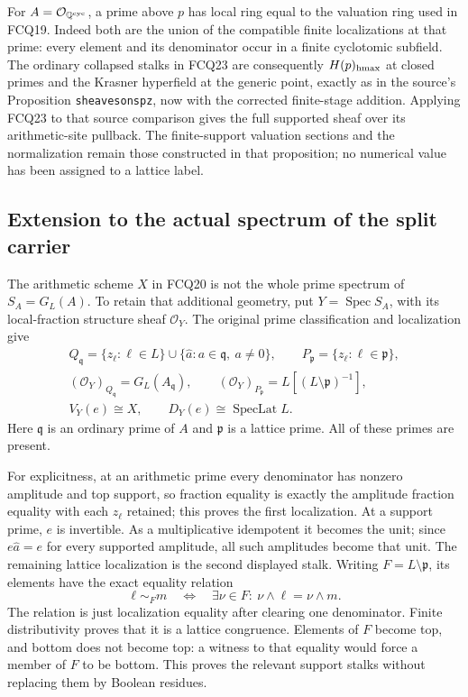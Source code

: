 For $A=\mathcal O_{\mathbb Q^{\rm cyc}}$, a prime above $p$
has local ring equal to the valuation ring used in FCQ19.
Indeed both are the union of the compatible finite
localizations at that prime: every element and its
denominator occur in a finite cyclotomic subfield.
The ordinary collapsed stalks in FCQ23 are consequently
$H(p)_{\rm hmax}$ at closed primes and the Krasner
hyperfield at the generic point, exactly as in the
source's Proposition \texttt{sheavesonspz}, now with
the corrected finite-stage addition. Applying FCQ23 to
that source comparison gives the full supported sheaf
over its arithmetic-site pullback. The finite-support
valuation sections and the normalization remain those
constructed in that proposition; no numerical value
has been assigned to a lattice label.

\subsection{Extension to the actual spectrum of the split carrier}

The arithmetic scheme $X$ in FCQ20 is not the whole
prime spectrum of $S_A=G_L(A)$. To retain that additional
geometry, put $Y=\operatorname{Spec}S_A$, with its
local-fraction structure sheaf $\mathcal O_Y$.
The original prime classification and localization give
\begin{equation}\tag{FCQ24}
\begin{gathered}
Q_{\mathfrak q}=\{z_\ell:\ell\in L\}
       \cup\{\widehat a:a\in\mathfrak q,\ a\ne0\},
\qquad
P_{\mathfrak p}=\{z_\ell:\ell\in\mathfrak p\},\\
(\mathcal O_Y)_{Q_{\mathfrak q}}=G_L(A_{\mathfrak q}),
\qquad
(\mathcal O_Y)_{P_{\mathfrak p}}
       =L[(L\setminus\mathfrak p)^{-1}],\\
V_Y(e)\cong X,\qquad D_Y(e)\cong\operatorname{SpecLat}L.
\end{gathered}
\end{equation}
Here $\mathfrak q$ is an ordinary prime of $A$ and
$\mathfrak p$ is a lattice prime. All of these primes
are present.

For explicitness, at an arithmetic prime every denominator
has nonzero amplitude and top support, so fraction equality
is exactly the amplitude fraction equality with each
$z_\ell$ retained; this proves the first localization.
At a support prime, $e$ is invertible. As a multiplicative
idempotent it becomes the unit; since
$e\widehat a=e$ for every supported amplitude, all such
amplitudes become that unit. The remaining lattice
localization is the second displayed stalk. Writing
$F=L\setminus\mathfrak p$, its elements have the exact
equality relation
\begin{equation}\tag{FCQ25}
\ell\sim_F m
\quad\Longleftrightarrow\quad
\exists\nu\in F:\ \nu\wedge\ell=\nu\wedge m.
\end{equation}
The relation is just localization equality after clearing
one denominator. Finite distributivity proves that it is
a lattice congruence. Elements of $F$ become top, and
bottom does not become top: a witness to that equality
would force a member of $F$ to be bottom. This proves
the relevant support stalks without replacing them by
Boolean residues.

